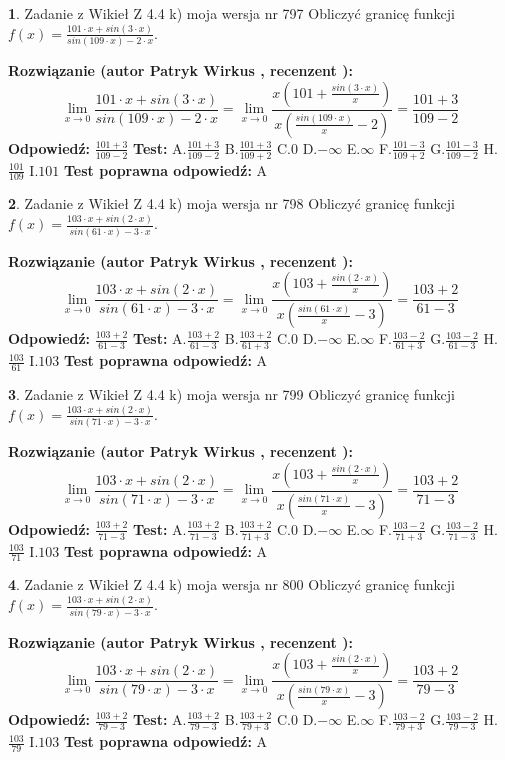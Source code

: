 \documentclass[12pt, a4paper]{article}
\theoremstyle{definition} %
\newtheorem{zad}{}
\newcommand{\zadStart}[1]{\begin{zad}#1\newline}
\newcommand{\zadStop}{\end{zad}}
\newcommand{\rozwStart}[2]{\noindent \textbf{Rozwiązanie (autor #1 , recenzent #2): }\newline}
\newcommand{\rozwStop}{\newline}
\newcommand{\odpStart}{\noindent \textbf{Odpowiedź:}\newline}
\newcommand{\odpStop}{\newline}
\newcommand{\testStart}{\noindent \textbf{Test:}\newline}
\newcommand{\testStop}{\newline}
\newcommand{\kluczStart}{\noindent \textbf{Test poprawna odpowiedź:}\newline}
\newcommand{\kluczStop}{\newline}
\begin{document}
\zadStart{Zadanie z Wikieł Z 4.4 k) moja wersja nr 797}
Obliczyć granicę funkcji $f(x)=\frac{101\cdot x +sin(3\cdot x)}{sin(109\cdot x) -2\cdot x}$.
\zadStop
\rozwStart{Patryk Wirkus}{}
$$\lim\limits_{x\to 0}\frac{101\cdot x +sin(3\cdot x)}{sin(109\cdot x) -2\cdot x}
=\lim\limits_{x\to 0}\frac{x(101+\frac{sin(3\cdot x)}{x})}{x(\frac{sin(109\cdot x)}{x}-2)}
=\frac{101+3}{109-2}$$
\rozwStop
\odpStart
$\frac{101+3}{109-2}$
\odpStop
\testStart
A.$\frac{101+3}{109-2}$
B.$\frac{101+3}{109+2}$
C.$0$
D.$-\infty$
E.$\infty$
F.$\frac{101-3}{109+2}$
G.$\frac{101-3}{109-2}$
H.$\frac{101}{109}$
I.$101$
\testStop
\kluczStart
A
\kluczStop



\zadStart{Zadanie z Wikieł Z 4.4 k) moja wersja nr 798}
Obliczyć granicę funkcji $f(x)=\frac{103\cdot x +sin(2\cdot x)}{sin(61\cdot x) -3\cdot x}$.
\zadStop
\rozwStart{Patryk Wirkus}{}
$$\lim\limits_{x\to 0}\frac{103\cdot x +sin(2\cdot x)}{sin(61\cdot x) -3\cdot x}
=\lim\limits_{x\to 0}\frac{x(103+\frac{sin(2\cdot x)}{x})}{x(\frac{sin(61\cdot x)}{x}-3)}
=\frac{103+2}{61-3}$$
\rozwStop
\odpStart
$\frac{103+2}{61-3}$
\odpStop
\testStart
A.$\frac{103+2}{61-3}$
B.$\frac{103+2}{61+3}$
C.$0$
D.$-\infty$
E.$\infty$
F.$\frac{103-2}{61+3}$
G.$\frac{103-2}{61-3}$
H.$\frac{103}{61}$
I.$103$
\testStop
\kluczStart
A
\kluczStop



\zadStart{Zadanie z Wikieł Z 4.4 k) moja wersja nr 799}
Obliczyć granicę funkcji $f(x)=\frac{103\cdot x +sin(2\cdot x)}{sin(71\cdot x) -3\cdot x}$.
\zadStop
\rozwStart{Patryk Wirkus}{}
$$\lim\limits_{x\to 0}\frac{103\cdot x +sin(2\cdot x)}{sin(71\cdot x) -3\cdot x}
=\lim\limits_{x\to 0}\frac{x(103+\frac{sin(2\cdot x)}{x})}{x(\frac{sin(71\cdot x)}{x}-3)}
=\frac{103+2}{71-3}$$
\rozwStop
\odpStart
$\frac{103+2}{71-3}$
\odpStop
\testStart
A.$\frac{103+2}{71-3}$
B.$\frac{103+2}{71+3}$
C.$0$
D.$-\infty$
E.$\infty$
F.$\frac{103-2}{71+3}$
G.$\frac{103-2}{71-3}$
H.$\frac{103}{71}$
I.$103$
\testStop
\kluczStart
A
\kluczStop



\zadStart{Zadanie z Wikieł Z 4.4 k) moja wersja nr 800}
Obliczyć granicę funkcji $f(x)=\frac{103\cdot x +sin(2\cdot x)}{sin(79\cdot x) -3\cdot x}$.
\zadStop
\rozwStart{Patryk Wirkus}{}
$$\lim\limits_{x\to 0}\frac{103\cdot x +sin(2\cdot x)}{sin(79\cdot x) -3\cdot x}
=\lim\limits_{x\to 0}\frac{x(103+\frac{sin(2\cdot x)}{x})}{x(\frac{sin(79\cdot x)}{x}-3)}
=\frac{103+2}{79-3}$$
\rozwStop
\odpStart
$\frac{103+2}{79-3}$
\odpStop
\testStart
A.$\frac{103+2}{79-3}$
B.$\frac{103+2}{79+3}$
C.$0$
D.$-\infty$
E.$\infty$
F.$\frac{103-2}{79+3}$
G.$\frac{103-2}{79-3}$
H.$\frac{103}{79}$
I.$103$
\testStop
\kluczStart
A
\kluczStop
\end{document}
